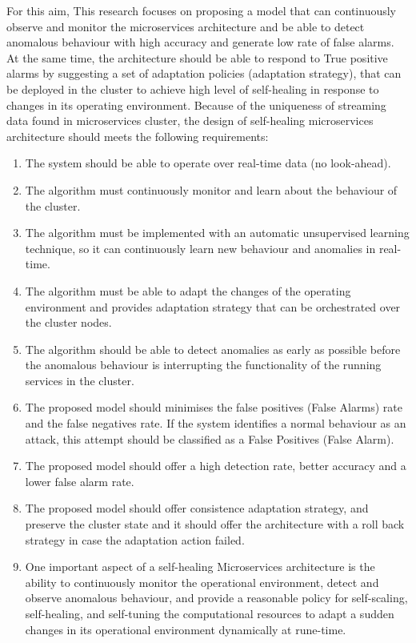\documentclass[sigconf]{acmart}
\begin{document}
For this aim, This research focuses on proposing a model that can continuously observe and monitor the microservices architecture and be able to detect anomalous behaviour with high accuracy and generate low rate of false alarms. At the same time, the architecture should be able to respond to True positive alarms by suggesting a set of adaptation policies (adaptation strategy), that can be deployed in the cluster to achieve high level of self-healing in response to changes in its operating environment. Because of the uniqueness of streaming data found in microservices cluster, the design of self-healing microservices architecture should meets the following requirements: 
\begin{enumerate}
  \item The system should be able to operate over real-time data (no look-ahead). 
  \item The algorithm must continuously monitor and learn about the behaviour of the cluster. 
  \item The algorithm must be implemented with an automatic unsupervised learning technique, so it can continuously learn new behaviour and anomalies in real-time. 
  \item The algorithm must be able to adapt the changes of the operating environment and provides adaptation strategy that can be orchestrated over the cluster nodes. 
  \item The algorithm should be able to detect anomalies as early as possible before the anomalous behaviour is interrupting the functionality of the running services in the cluster. 
  \item The proposed model should minimises the false positives (False Alarms) rate and the false negatives rate. If the system identifies a normal behaviour as an attack, this attempt should be classified as a False Positives (False Alarm). 
  \item The proposed model should offer a high detection rate, better accuracy and a lower false alarm rate.
  \item The proposed model should offer consistence adaptation strategy, and preserve the cluster state and it should offer the architecture with a roll back strategy in case the adaptation action failed. 
  \item One important aspect of a self-healing Microservices architecture is the ability to continuously monitor the operational environment, detect and observe anomalous behaviour, and provide a reasonable policy for self-scaling, self-healing, and self-tuning the computational resources to adapt a sudden changes in its operational environment dynamically at rune-time.  
\end{enumerate}
\end{document}

